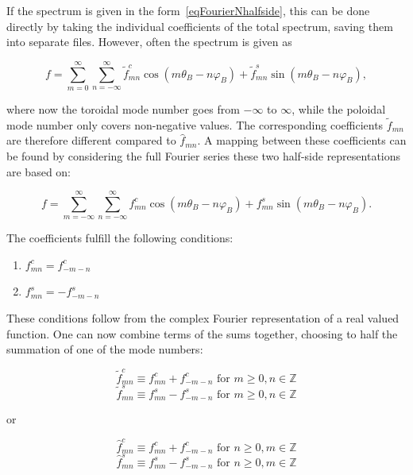 \documentclass{article}
\begin{document}
If the spectrum is given in the form~\ref{eqFourierNhalfside}, this can be done directly by taking the individual coefficients of the total spectrum, saving them into separate files. However, often the spectrum is given as

\begin{equation}
	f = \sum_{m=0}^{\infty} \sum_{n=-\infty}^{\infty} \tilde{f}^c_{mn}\cos{(m\theta_B - n\varphi_B)} + \tilde{f}^s_{mn}\sin{(m\theta_B - n\varphi_B)},
\end{equation}

where now the toroidal mode number goes from $-\infty$ to $\infty$, while the poloidal mode number only covers non-negative values. The corresponding coefficients $\tilde{f}_{mn}$ are therefore different compared to $\hat{f}_{mn}$. A mapping between these coefficients can be found by considering the full Fourier series these two half-side representations are based on:

\begin{equation}
	f = \sum_{m=-\infty}^{\infty} \sum_{n=-\infty}^{\infty} f^c_{mn}\cos{(m\theta_B - n\varphi_B)} + f^s_{mn}\sin{(m\theta_B - n\varphi_B)}.
\end{equation}

The coefficients fulfill the following conditions:

\begin{enumerate}
	\item $f^c_{mn} = f^c_{-m-n}$
	\item $f^s_{mn} = -f^s_{-m-n}$
\end{enumerate}

These conditions follow from the complex Fourier representation of a real valued function.
One can now combine terms of the sums together, choosing to half the summation of one of the mode numbers:

\begin{equation*}
	\tilde{f}^c_{mn} \equiv f^c_{mn} + f^c_{-m-n} \text{ for } m \geq 0 , n \in \mathbb{Z}
\end{equation*}
\begin{equation*}
	\tilde{f}^s_{mn} \equiv f^s_{mn} - f^s_{-m-n} \text{ for } m \geq 0 , n \in \mathbb{Z}
\end{equation*}

or

\begin{equation*}
	\hat{f}^c_{mn} \equiv f^c_{mn} + f^c_{-m-n} \text{ for } n \geq 0 , m \in \mathbb{Z}
\end{equation*}
\begin{equation*}
	\hat{f}^s_{mn} \equiv f^s_{mn} - f^s_{-m-n} \text{ for } n \geq 0 , m \in \mathbb{Z}
\end{equation*}
\end{document}
